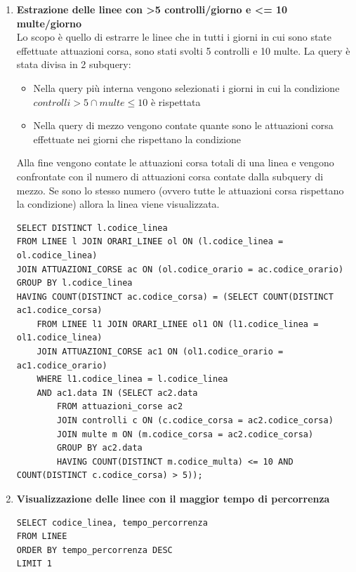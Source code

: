 \documentclass[12pt,a4paper]{report}
\begin{document}
\begin{enumerate}[label=\textbf{\arabic*)}]
\item \textbf{Estrazione delle linee con \textgreater 5 controlli/giorno e \textless = 10 multe/giorno} \\
Lo scopo è quello di estrarre le linee che in tutti i giorni in cui sono state effettuate attuazioni corsa, sono stati svolti 5 controlli e 10 multe.
La query è stata divisa in 2 subquery:
\begin{itemize}
  \item Nella query più interna vengono selezionati i giorni in cui la condizione $ controlli > 5  \cap multe \leq 10  $ è rispettata
  \item Nella query di mezzo vengono contate quante sono le attuazioni corsa effettuate nei giorni che rispettano la condizione
\end{itemize}
Alla fine vengono contate le attuazioni corsa totali di una linea e vengono confrontate con il numero di attuazioni corsa contate dalla subquery di mezzo. Se sono lo stesso numero (ovvero tutte le attuazioni corsa rispettano la condizione) allora la linea viene visualizzata.
\begin{lstlisting}[style=sqlstyle, caption=Query to Find Lines Matching Fine/Control Conditions on All Trips]
SELECT DISTINCT l.codice_linea
FROM LINEE l JOIN ORARI_LINEE ol ON (l.codice_linea = ol.codice_linea)
JOIN ATTUAZIONI_CORSE ac ON (ol.codice_orario = ac.codice_orario)
GROUP BY l.codice_linea
HAVING COUNT(DISTINCT ac.codice_corsa) = (SELECT COUNT(DISTINCT ac1.codice_corsa)
    FROM LINEE l1 JOIN ORARI_LINEE ol1 ON (l1.codice_linea = ol1.codice_linea)
    JOIN ATTUAZIONI_CORSE ac1 ON (ol1.codice_orario = ac1.codice_orario)
    WHERE l1.codice_linea = l.codice_linea
    AND ac1.data IN (SELECT ac2.data
        FROM attuazioni_corse ac2
        JOIN controlli c ON (c.codice_corsa = ac2.codice_corsa)
        JOIN multe m ON (m.codice_corsa = ac2.codice_corsa)
        GROUP BY ac2.data
        HAVING COUNT(DISTINCT m.codice_multa) <= 10 AND COUNT(DISTINCT c.codice_corsa) > 5));
\end{lstlisting}

\item \textbf{Visualizzazione delle linee con il maggior tempo di percorrenza} \\
\begin{lstlisting}[style=sqlstyle, caption=Query for Line with Maximum Tempo Percorrenza]
SELECT codice_linea, tempo_percorrenza
FROM LINEE
ORDER BY tempo_percorrenza DESC
LIMIT 1
\end{lstlisting}


\end{enumerate}
\end{document}
